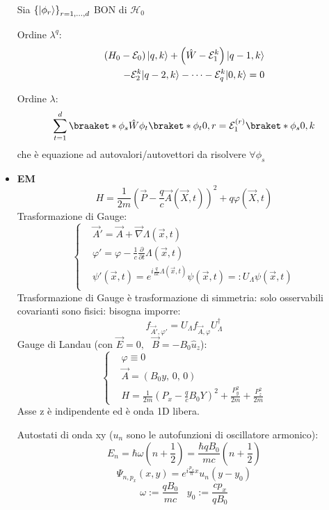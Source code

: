 \documentclass{article}
\DeclarePairedDelimiter\ket{\lvert}{\rangle}
\begin{document}
\begin{footnotesize}
\begin{multicols*}{3}
\begin{itemize}[leftmargin=*]
		Sia $\left\{\ket*{\phi _r}\right\}_{r=1,\dots,d}$ BON di $\mathcal{H}_0$

		Ordine $\lambda ^q$:
	\begin{align*}
\left(H_0 - \mathcal{E}_0\right)\ket*{q,k} %
+ \left(\hat{W}-\mathcal{E}_1^k\right)\ket*{q-1,k}\\
- \mathcal{E}_2^k\ket*{q-2,k} - \dots - \mathcal{E}_q^k\ket*{0,k} = 0
	\end{align*}

		Ordine $\lambda $:
		\begin{align*}\sum_{t=1}^{d} \braaket*{\phi _s}{\hat{W}}{\phi _t}\braket*{\phi _t}{0,r} = \mathcal{E}_1^{(r)} \braket*{\phi _s}{0,k}\end{align*}
		che è equazione ad autovalori/autovettori da risolvere $\forall \phi _s$


	\item \textbf{EM}
		\[H= \frac{1}{2m} \left(\vec{P} - \frac{q}{c}\vec{A}(\vec{X},t)\right)^2 + q\varphi (\vec{X},t)\]
		Trasformazione di Gauge:
		\[
			\left\{\begin{aligned}
				&\vec{A}' = \vec{A} + \vec{\nabla} \Lambda (\vec{x},t)\\
				&\varphi ' = \varphi -\frac{1}{c}\frac{\partial}{\partial t}\Lambda (\vec{x},t)\\
				&\psi '(\vec{x},t) = e^{i \frac{q}{\hbar c} \Lambda (\vec{x},t)}  \psi (\vec{x},t) =: U_{\Lambda } \psi (\vec{x},t)\\
			\end{aligned}\right.
		\]
		Trasformazione di Gauge è trasformazione di simmetria: solo osservabili covarianti sono fisici: bisogna imporre:
		\[f_{\vec{A}', \varphi '} = U_\Lambda f_{\vec{A},\varphi } U_\Lambda ^\dag\]
		Gauge di Landau (con $\vec{E}=0,\ \ \ \vec{B} = -B_0\hat{u}_z$):
		\[
			\left\{\begin{aligned}
				&\varphi \equiv 0\\
				&\vec{A} = \left(B_0y,\,0,\,0\right)\\
				&H = \frac{1}{2m}\left(P_x - \frac{q}{c}B_0Y\right)^2 + \frac{P_y^2}{2m} + \frac{P_z^2}{2m}
			\end{aligned}\right.
		\]
		Asse z è indipendente ed è onda 1D libera.

		Autostati di onda xy ($u_n$ sono le autofunzioni di oscillatore armonico):
		\[E_n = \hbar \omega \left(n+\frac{1}{2}\right) = \frac{\hbar qB_0}{mc}\left(n+\frac{1}{2}\right)\]
		\[\Psi _{n,p_x}(x,y) = e^{i\frac{p_x}{\hbar }x} u_n(y-y_0)\]
		\[\omega :=\frac{qB_0}{mc}\hspace{10pt} y_0:= \frac{cp_x}{qB_0}\]


\end{itemize}
\end{multicols*}
\end{footnotesize}
\end{document}
